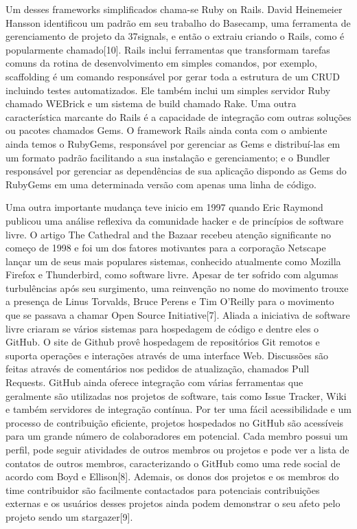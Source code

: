	Um desses frameworks simplificados chama-se Ruby on Rails. David Heinemeier Hansson identificou um padrão em seu trabalho do Basecamp, uma ferramenta de gerenciamento de projeto da 37signals, e então o extraiu criando o Rails, como é popularmente chamado[10]. Rails inclui ferramentas que transformam tarefas comuns da rotina de desenvolvimento em simples comandos, por exemplo, scaffolding é um comando responsável por gerar toda a estrutura de um CRUD incluindo testes automatizados. Ele também inclui um simples servidor Ruby chamado WEBrick e um sistema de build chamado Rake. Uma outra característica marcante do Rails é a capacidade de integração com outras soluções ou pacotes chamados Gems. O framework Rails ainda conta com  o ambiente ainda temos o RubyGems, responsável por gerenciar as Gems e distribuí-las em um formato padrão facilitando a sua instalação e gerenciamento; e o Bundler responsável por gerenciar as dependências de sua aplicação dispondo as Gems do RubyGems em uma determinada versão com apenas uma linha de código.

Uma outra importante mudança teve inicio em 1997 quando Eric Raymond publicou uma análise reflexiva da comunidade hacker e de princípios de software livre. O artigo The Cathedral and the Bazaar recebeu atenção significante no começo de 1998 e foi um dos fatores motivantes para a corporação Netscape lançar um de seus mais populares sistemas, conhecido atualmente como Mozilla Firefox e Thunderbird, como software livre. Apesar de ter sofrido com algumas turbulências após seu surgimento, uma reinvenção no nome do movimento trouxe a presença de Linus Torvalds, Bruce Perens e Tim O'Reilly para o movimento que se passava a chamar Open Source Initiative[7]. Aliada a iniciativa de software livre criaram se vários sistemas para hospedagem de código e dentre eles o GitHub. O site de Github provê hospedagem de repositórios Git remotos e suporta operações e interações através de uma interface Web. Discussões são feitas através de comentários nos pedidos de atualização, chamados Pull Requests. GitHub ainda oferece integração com várias ferramentas que geralmente são utilizadas nos projetos de software, tais como Issue Tracker, Wiki e também servidores de integração contínua. Por ter uma fácil acessibilidade e um processo de contribuição eficiente, projetos hospedados no GitHub são acessíveis para um grande número de colaboradores em potencial. Cada membro possui um perfil, pode seguir atividades de outros membros ou projetos e pode ver a lista de contatos de outros membros, caracterizando o GitHub como uma rede social de acordo com Boyd e Ellison[8]. Ademais, os donos dos projetos e os membros do time contribuidor são facilmente contactados para potenciais contribuições externas e os usuários desses projetos ainda podem demonstrar o seu afeto pelo projeto sendo um stargazer[9].


